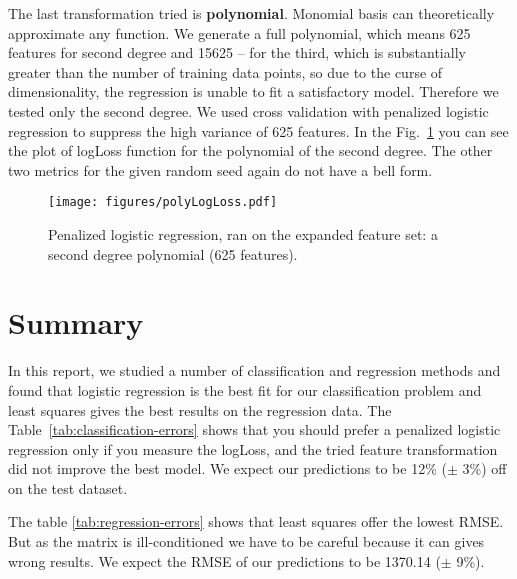 \documentclass{article} %
\begin{document}
The last transformation tried is {\bf polynomial}. Monomial basis can theoretically approximate any function. We generate a full polynomial, which means 625 features for second degree and 15625 -- for the third, which is substantially greater than the number of training data points, so due to the curse of dimensionality, the regression is unable to fit a satisfactory model. Therefore we tested only the second degree. We used cross validation with penalized logistic regression to suppress the high variance of 625 features. In the Fig.~\ref{fig:polyErrors} you can see the plot of logLoss function for the polynomial of the second degree. The other two metrics for the given random seed again do not have a bell form.

\begin{figure}[h]
\center
\texttt{[image: figures/polyLogLoss.pdf]}
\caption{Penalized logistic regression, ran on the expanded feature set: a second degree polynomial (625 features).}
\label{fig:polyErrors}
\end{figure}

\section{Summary}

In this report, we studied a number of classification and regression methods and found that logistic regression is the best fit for our classification problem and least squares gives the best results on the regression data. The Table~\ref{tab:classification-errors} shows that you should prefer a penalized logistic regression only if you measure the logLoss, and the tried feature transformation did not improve the best model. We expect our predictions to be 12\% ($\pm$ 3\%) off on the test dataset.

The table \ref{tab:regression-errors} shows that least squares offer the lowest RMSE. But as the matrix is ill-conditioned we have to be careful because it can gives wrong results. 
We expect the RMSE of our predictions to be 1370.14 ($\pm$ 9\%).
\end{document}
